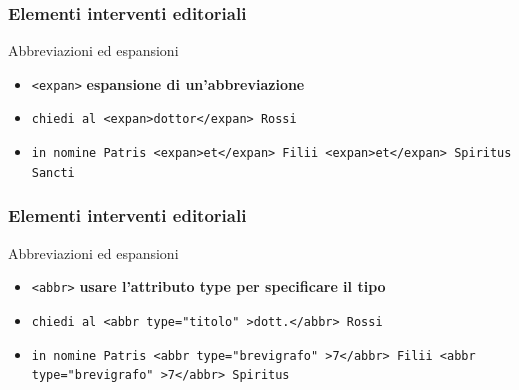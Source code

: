 \begin{frame}
    \frametitle{Elementi interventi editoriali}
    \addtocounter{nframe}{1}
    

    \begin{block}{Abbreviazioni ed espansioni}
        \begin{itemize}
            \item \texttt{<expan>} \textbf{espansione di un’abbreviazione}
            \item[] \texttt{chiedi al <expan>dottor</expan> Rossi}
            \item[] \texttt{in nomine Patris <expan>et</expan> Filii <expan>et</expan> Spiritus Sancti}
        \end{itemize}
        
    \end{block}
    
\end{frame}


 \begin{frame}
    \frametitle{Elementi interventi editoriali}
    \addtocounter{nframe}{1}
    

    \begin{block}{Abbreviazioni ed espansioni}
        \begin{itemize}
            \item \texttt{<abbr>} \textbf{usare l’attributo type per specificare il tipo}
            \item[] \texttt{chiedi al <abbr type="titolo" >dott.</abbr> Rossi}
            \item[] \texttt{in nomine Patris <abbr type="brevigrafo" >7</abbr> Filii <abbr type="brevigrafo" >7</abbr> Spiritus}
        \end{itemize}
        
    \end{block}
    
\end{frame}

